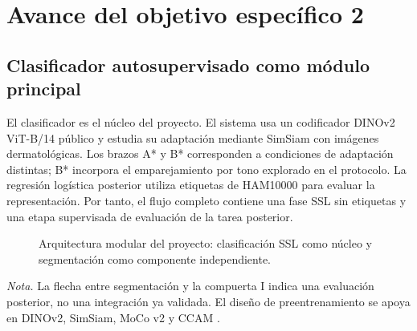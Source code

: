 \chapter{Avance del objetivo específico 2}

\section{Clasificador autosupervisado como módulo principal}

El clasificador es el núcleo del proyecto. El sistema usa un codificador DINOv2 ViT-B/14 público y estudia su adaptación mediante SimSiam con imágenes dermatológicas. Los brazos A* y B* corresponden a condiciones de adaptación distintas; B* incorpora el emparejamiento por tono explorado en el protocolo. La regresión logística posterior utiliza etiquetas de HAM10000 para evaluar la representación. Por tanto, el flujo completo contiene una fase SSL sin etiquetas y una etapa supervisada de evaluación de la tarea posterior.

\begin{figure}[htbp]
\centering
{}
\caption{Arquitectura modular del proyecto: clasificación SSL como núcleo y segmentación como componente independiente.}
\label{fig:arquitectura-modular}
\end{figure}
\noindent\textit{Nota.} La flecha entre segmentación y la compuerta I indica una evaluación posterior, no una integración ya validada. El diseño de preentrenamiento se apoya en DINOv2, SimSiam, MoCo v2 y CCAM \parencite{oquab2024dinov2,chen2021simsiam,chen2020mocov2,xie2022ccam}.

